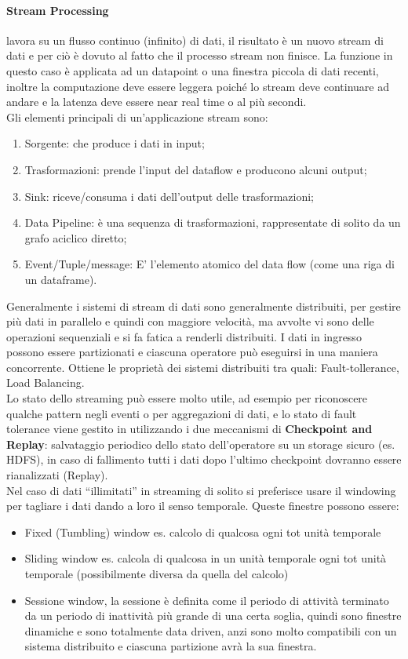 \documentclass[11pt, twocolumn]{article}
\newenvironment{myitemize}
{ \begin{itemize}[topsep=0ex]
		\setlength{\itemsep}{0pt}
		\setlength{\parskip}{0pt}
		\setlength{\parsep}{0pt}     }
	{ \end{itemize}                  }
\newenvironment{myenumerate}
{ \begin{enumerate}[topsep=0ex]
		\setlength{\itemsep}{0pt}
		\setlength{\parskip}{0pt}
		\setlength{\parsep}{0pt}     }
	{ \end{enumerate}                  }
\begin{document}
\paragraph{Stream Processing} lavora su un flusso continuo (infinito) di dati, il risultato è un nuovo stream di dati e per ciò è dovuto al fatto che il processo stream non finisce. La funzione in questo caso è applicata ad un datapoint o una finestra piccola di dati recenti, inoltre la computazione deve essere leggera poiché lo stream deve continuare ad andare e la latenza deve essere near real time o al più secondi.\\
Gli elementi principali di un'applicazione stream sono:
\begin{myenumerate}
	\item Sorgente: che produce i dati in input;
	\item Trasformazioni: prende l'input del dataflow e producono alcuni output;
	\item Sink: riceve/consuma i dati dell'output delle trasformazioni;
	\item Data Pipeline: è una sequenza di trasformazioni, rappresentate di solito da un grafo aciclico diretto;
	\item Event/Tuple/message: E' l'elemento atomico del data flow (come una riga di un dataframe).
\end{myenumerate}
Generalmente i sistemi di stream di dati sono generalmente distribuiti, per gestire più dati in parallelo e quindi con maggiore velocità, ma avvolte vi sono delle operazioni sequenziali e si fa fatica a renderli distribuiti. I dati in ingresso possono essere partizionati e ciascuna operatore può eseguirsi in una maniera concorrente. Ottiene le proprietà dei sistemi distribuiti tra quali: Fault-tollerance, Load Balancing.\\
Lo stato dello streaming può essere molto utile, ad esempio per riconoscere qualche pattern negli eventi o per aggregazioni di dati, e lo stato di fault tolerance viene gestito in utilizzando i due meccanismi di \textbf{Checkpoint and Replay}: salvataggio periodico dello stato dell'operatore su un storage sicuro (es. HDFS), in caso di fallimento tutti i dati dopo l'ultimo checkpoint dovranno essere rianalizzati (Replay).\\
Nel caso di dati ``illimitati'' in streaming di solito si preferisce usare il windowing per tagliare i dati dando a loro il senso temporale. Queste finestre possono essere:
\begin{myitemize}
	\item Fixed (Tumbling) window es. calcolo di qualcosa ogni tot unità temporale
	\item Sliding window es. calcola di qualcosa in un unità temporale ogni tot unità temporale (possibilmente diversa da quella del calcolo)
	\item Sessione window, la sessione è definita come il periodo di attività terminato da un periodo di inattività più grande di una certa soglia, quindi sono finestre dinamiche e sono totalmente data driven, anzi sono molto compatibili con un sistema distribuito e ciascuna partizione avrà la sua finestra.
\end{myitemize}
\end{document}
